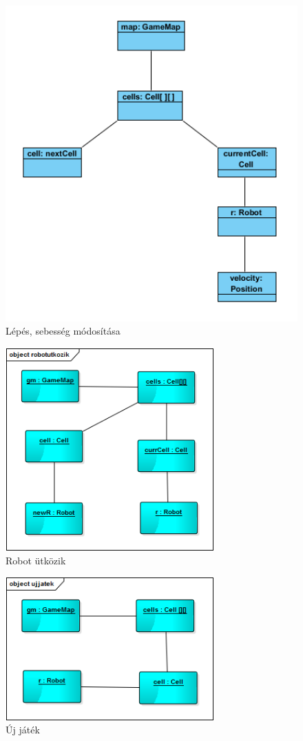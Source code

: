 \begin{figure}[!htbp]
	\begin{center}
		\includegraphics[width=12cm]{./chapters/chapter05/stepobject.png}
		\caption{Lépés, sebesség módosítása}
	\end{center}
\end{figure}


\begin{figure}[!htbp]
	\begin{center}
		\includegraphics[width=8cm]{./chapters/chapter05/robotutkozikobj.png}
		\caption{Robot ütközik}
	\end{center}
\end{figure}


\begin{figure}[!htbp]
	\begin{center}
		\includegraphics[width=8cm]{./chapters/chapter05/ujjatekobj.png}
		\caption{Új játék}
	\end{center}
\end{figure}

\clearpage
